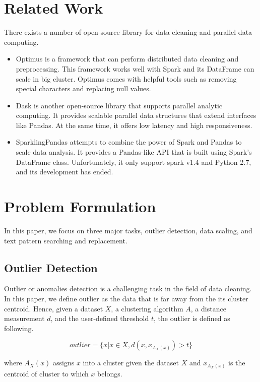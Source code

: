 \documentclass[sigconf]{acmart}
\begin{document}
\section{Related Work}
There exists a number of open-source library for data cleaning and parallel data computing. 
\begin{itemize}
	\item{Optimus}\cite{optimus} is a framework that can perform distributed data cleaning and preprocessing. This framework works well with Spark and its DataFrame can scale in big cluster. Optimus comes with helpful tools such as removing special characters and replacing null values.
	\item{Dask}\cite{dask} is another open-source library that supports parallel analytic computing. It provides scalable parallel data structures that extend interfaces like Pandas. At the same time, it offers low latency and high responsiveness.
	\item{SparklingPandas}\cite{sparklingpandas} attempts to combine the power of Spark and Pandas to scale data analysis. It provides a Pandas-like API that is built using Spark's DataFrame class. Unfortunately, it only support spark v1.4 and Python 2.7, and its development has ended.
\end{itemize}

\section{Problem Formulation}
In this paper, we focus on three major tasks, outlier detection, data scaling, and text pattern searching and replacement.
\subsection{Outlier Detection}
Outlier or anomalies detection is a challenging task in the field of data cleaning\cite{anomal}. In this paper, we define outlier as the data that is far away from the its cluster centroid. Hence, given a dataset $X$, a clustering algorithm $A$\cite{MMD}, a distance measurement $d$, and the user-defined threshold $t$, the outlier is defined as following.

\[ outlier = \{x | x \in X, d( x, x_{A_X(x)} ) > t \}  \]

where $A_X(x)$ assigns $x$ into a cluster given the dataset $X$ and $x_{A_X(x)}$  is the centroid of cluster to which $x$ belongs.
\end{document}
